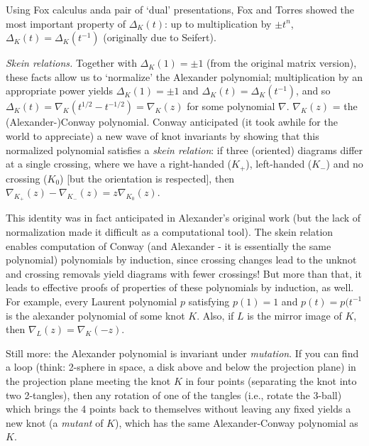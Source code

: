 \ssk

Using Fox calculus anda  pair of `dual' presentations, Fox and Torres showed the most important property
of $\Delta_K(t)$: up to multiplication by $\pm t^n$, $\Delta_K(t)=\Delta_K(t^{-1})$ (originally
due to Seifert).

\msk

{\it Skein relations.} Together with $\Delta_K(1)=\pm 1$ (from the original matrix version), 
these facts allow us to
`normalize' the Alexander polynomial; multiplication by an appropriate power yields
$\Delta_K(1)=\pm 1$ and $\Delta_K(t)=\Delta_K(t^{-1})$, and so
$\Delta_K(t)=\nabla_K(t^{1/2}-t^{-1/2})=\nabla_K(z)$ for some polynomial $\nabla$.
$\nabla_K(z)$ = the (Alexander-)Conway polynomial. Conway anticipated (it took awhile 
for the world to appreciate) a new wave of knot invariants by showing that this
normalized polynomial satisfies a {\it skein relation}: if three (oriented) diagrams differ at
a single crossing, where we have a right-handed ($K_+$), left-handed ($K_-$) and no
crossing ($K_0$) [but the orientation is respected], then 
$\nabla_{K_+}(z)-\nabla_{K_-}(z)=z\nabla_{K_0}(z)$. 

\ssk

This identity was in fact anticipated in Alexander's original work (but the lack of normalization
made it difficult as a computational tool). The skein relation enables computation of Conway
(and Alexander - it is essentially the same polynomial) polynomials by induction, since crossing
changes lead to the unknot and crossing removals yield diagrams with fewer crossings! But more than
that, it leads to effective proofs of properties of these polynomials by induction, as well.
For example, every Laurent polynomial $p$ satisfying $p(1)=1$ and $p(t)=p(t^{-1}$ is the 
alexander polynomial of some knot $K$. Also, if $L$ is the mirror image of $K$, then 
$\nabla_L(z)=\nabla_K(-z)$.

\ssk

Still more: the Alexander polynomial is invariant under 
{\it mutation}. If you can find a loop (think: 2-sphere in space, 
a disk above and below the projection plane) in the projection plane meeting the knot $K$ in 
four points (separating the knot into two 2-tangles), then any rotation of one of the
tangles (i.e., rotate the 3-ball) which brings the 4 points back to themselves
without leaving any fixed yields a new knot (a {\it mutant} of $K$), which has the
same Alexander-Conway polynomial as $K$.

\msk


